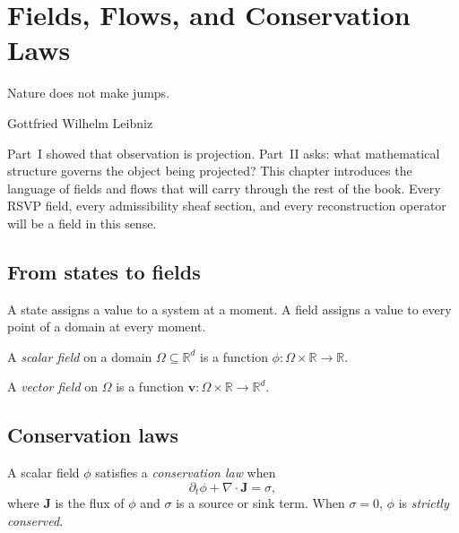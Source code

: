 
\chapter{Fields, Flows, and Conservation Laws}
\label{ch:fields-flows}

\epigraph{%
  Nature does not make jumps.%
}{Gottfried Wilhelm Leibniz}

\begin{WhyMatters}
  Part~I showed that observation is projection.
  Part~II asks: what mathematical structure governs the
  object being projected?
  This chapter introduces the language of fields and flows
  that will carry through the rest of the book.
  Every RSVP field, every admissibility sheaf section, and
  every reconstruction operator will be a field in this sense.
\end{WhyMatters}

\section{From states to fields}

A state assigns a value to a system at a moment.
A field assigns a value to every point of a domain at every
moment.

\begin{definition}
  A \emph{scalar field} on a domain $\Omega \subseteq \mathbb{R}^d$
  is a function $\phi : \Omega \times \mathbb{R} \to \mathbb{R}$.
\end{definition}

\begin{definition}
  A \emph{vector field} on $\Omega$ is a function
  $\mathbf{v} : \Omega \times \mathbb{R} \to \mathbb{R}^d$.
\end{definition}

\section{Conservation laws}

\begin{definition}
  A scalar field $\phi$ satisfies a \emph{conservation law} when
  \[
    \partial_t \phi + \nabla \cdot \mathbf{J} = \sigma,
  \]
  where $\mathbf{J}$ is the flux of $\phi$ and $\sigma$ is a
  source or sink term.
  When $\sigma = 0$, $\phi$ is \emph{strictly conserved}.
\end{definition}

